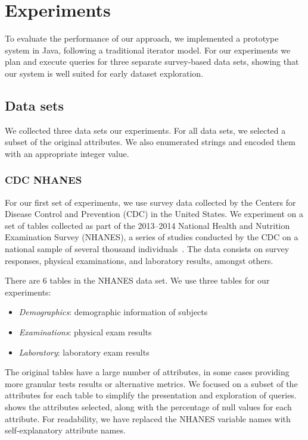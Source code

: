 \newcommand{\demorows}{10175}
\newcommand{\labexrows}{9813}
\newcommand{\acsbaseresultminutes}{355 minutes}
\newcommand{\acsbaseresulthours}{just under 6 hours}
\newcommand{\acsimputedbzeroresult}{4 seconds}
\newcommand{\acsimputedboneresult}{1 second}

\section{Experiments}\label{sec:experiments}
To evaluate the performance of our approach,  we implemented
a prototype system in Java, following a traditional iterator model.
For our experiments we plan and execute queries
for three separate survey-based data sets, showing that our system
is well suited for early dataset exploration.

\subsection{Data sets} \label{subsec:datasets}
We collected three data sets our experiments.
For all data sets, we selected a subset of the original attributes.
We also enumerated strings and encoded them with an appropriate integer value.

\subsubsection{CDC NHANES}
For our first set of experiments, we use survey data collected by the 
Centers for Disease Control and Prevention (CDC) in the United States. We
experiment on a set of tables collected as part of the 2013--2014 National
Health and Nutrition Examination Survey (NHANES), a series of studies
conducted by the CDC on a national sample of several thousand individuals~\cite{cdc-data}.
The data consists on survey responses, physical examinations, and laboratory
results, amongst others.

There are 6 tables in the NHANES data set. We use three tables for our experiments:

\begin{itemize}
	\item \emph{Demographics}: demographic information of subjects
	\item \emph{Examinations}: physical exam results
	\item \emph{Laboratory}: laboratory exam results
\end{itemize}

The original tables have a large number of attributes, in some cases providing more granular tests results or alternative metrics.
We focused on a subset of the attributes for each table to simplify the presentation and exploration of queries.
 shows the attributes selected, along with the percentage of null values for each attribute.
For readability, we have replaced the NHANES variable names with self-explanatory attribute names.

